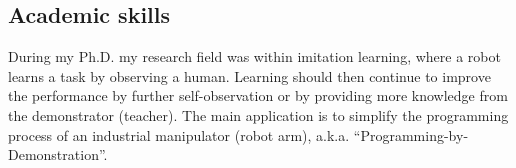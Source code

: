\documentclass[a4paper,margin,line]{res} \usepackage{latexsym}
\newenvironment{list2}{
  \begin{list}{$\bullet$}{%
      \setlength{\itemsep}{0in} \setlength{\parsep}{0in}
      \setlength{\parskip}{0in} \setlength{\topsep}{0in}
      \setlength{\partopsep}{0in}
      \setlength{\leftmargin}{0.2in}}}{\end{list}}
\begin{document}
\begin{resume}
\section{\sc Academic skills}
During my Ph.D. my research field was within imitation learning, where
a robot learns a task by observing a human.  Learning should then
continue to improve the performance by further self-observation or by
providing more knowledge from the demonstrator (teacher). The main
application is to simplify the programming process of an industrial
manipulator (robot arm), a.k.a. ``Programming-by-Demonstration''.









\end{resume}
\end{document}

